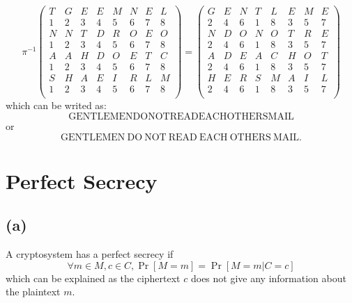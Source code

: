 \documentclass[a4paper,12pt]{article}
\begin{document}
\begin{equation}
    \pi^{-1}
    \begin{pmatrix}
        T & G & E & E & M & N & E & L \\
        1 & 2 & 3 & 4 & 5 & 6 & 7 & 8 \\
        N & N & T & D & R & O & E & O \\
        1 & 2 & 3 & 4 & 5 & 6 & 7 & 8 \\
        A & A & H & D & O & E & T & C \\
        1 & 2 & 3 & 4 & 5 & 6 & 7 & 8 \\
        S & H & A & E & I & R & L & M \\
        1 & 2 & 3 & 4 & 5 & 6 & 7 & 8 \\
    \end{pmatrix}
    =
    \begin{pmatrix}
        G & E & N & T & L & E & M & E \\
        2 & 4 & 6 & 1 & 8 & 3 & 5 & 7 \\
        N & D & O & N & O & T & R & E \\
        2 & 4 & 6 & 1 & 8 & 3 & 5 & 7 \\
        A & D & E & A & C & H & O & T \\
        2 & 4 & 6 & 1 & 8 & 3 & 5 & 7 \\
        H & E & R & S & M & A & I & L \\
        2 & 4 & 6 & 1 & 8 & 3 & 5 & 7 \\
    \end{pmatrix}
\end{equation}
which can be writed as:
\begin{equation}
    \mathrm{GENTLEMENDONOTREADEACHOTHERSMAIL}
\end{equation}
or
\begin{equation}
    \mathrm{GENTLEMEN~DO~NOT~READ~EACH~OTHERS~MAIL}.
\end{equation}
\section{Perfect Secrecy}
\subsection{(a)}
A cryptosystem has a perfect secrecy if
\begin{equation}
    \forall m \in M, c\in C, \Pr[M=m] = \Pr[M=m | C=c]
\end{equation}
which can be explained as the ciphertext $c$ does not give any information about the plaintext $m$.
\end{document}
